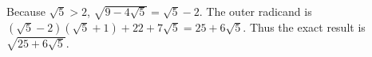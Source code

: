 Because $\sqrt5>2$, $\sqrt{9-4\sqrt5}=\sqrt5-2$. The outer radicand is $(\sqrt5-2)(\sqrt5+1)+22+7\sqrt5=25+6\sqrt5$. Thus the exact result is $\boxed{\sqrt{25+6\sqrt5}}$.
